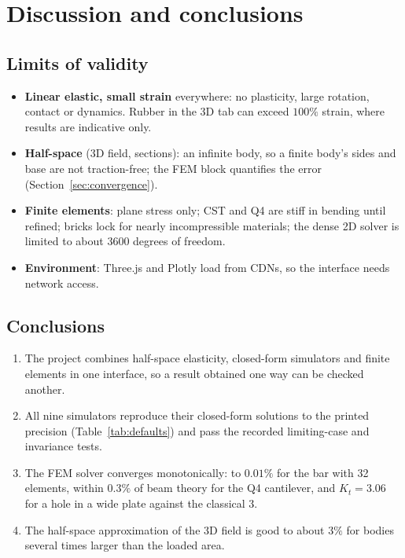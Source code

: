 \chapter{Discussion and conclusions}
\label{ch:discuss}

\section{Limits of validity}
\begin{itemize}[nosep]
\item \textbf{Linear elastic, small strain} everywhere: no plasticity, large rotation, contact or dynamics. Rubber in the 3D tab can exceed $100\%$ strain, where results are indicative only.
\item \textbf{Half-space} (3D field, sections): an infinite body, so a finite body's sides and base are not traction-free; the FEM block quantifies the error (Section~\ref{sec:convergence}).
\item \textbf{Finite elements}: plane stress only; CST and Q4 are stiff in bending until refined; bricks lock for nearly incompressible materials; the dense 2D solver is limited to about 3600 degrees of freedom.
\item \textbf{Environment}: Three.js and Plotly load from CDNs, so the interface needs network access.
\end{itemize}

\section{Conclusions}
\begin{enumerate}[nosep]
\item The project combines half-space elasticity, closed-form simulators and finite elements in one interface, so a result obtained one way can be checked another.
\item All nine simulators reproduce their closed-form solutions to the printed precision (Table~\ref{tab:defaults}) and pass the recorded limiting-case and invariance tests.
\item The FEM solver converges monotonically: to $0.01\%$ for the bar with 32 elements, within $0.3\%$ of beam theory for the Q4 cantilever, and $K_t=3.06$ for a hole in a wide plate against the classical $3$.
\item The half-space approximation of the 3D field is good to about $3\%$ for bodies several times larger than the loaded area.
\end{enumerate}

